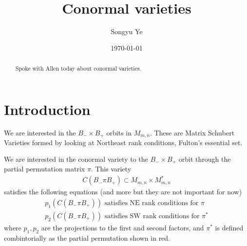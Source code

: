 \documentclass[12pt]{article}
\begin{document}
\rhead{\today}
\cfoot{\thepage}

\title{Conormal varieties}

\author{Songyu Ye}
\date{\today}
\maketitle


\begin{abstract}
	Spoke with Allen today about conormal varieties.
\end{abstract}

\tableofcontents

\section{Introduction}
We are interested in the $B_- \times B_+$ orbits in $M_{m,n}$.
These are Matrix Schubert Varieties formed by looking at
Northeast rank conditions, Fulton's essential set.

\vspace{1em}
We are interested in the conormal variety to the $B_- \times B_+$ orbit
through the partial permutation matrix $\pi$. This variety \begin{align*}
	C(B_- \pi B_+) \subset M_{m,n} \times M_{m,n}^*
\end{align*} satisfies the following equations (and more but they
are not important for now) \begin{align*}
	p_1(C(B_- \pi B_+)) \text{ satisfies NE rank conditions for } \pi \\
	p_2(C(B_- \pi B_+)) \text{ satisfies SW rank conditions for } \pi^*
\end{align*} where $p_1, p_2$ are the projections to the first and second
factors, and $\pi^*$ is defined combintorially as the partial permutation shown
in red.

\begin{center}
\end{center}
\end{document}
